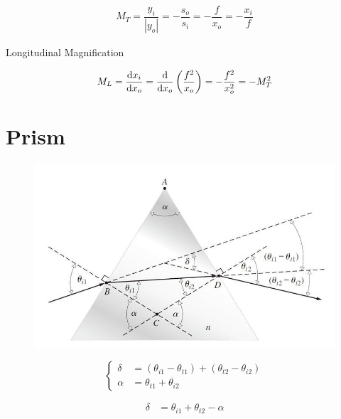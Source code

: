 \begin{equation*}
  \begin{aligned}
    M_T = \dfrac{y_i}{|y_o|} = - \dfrac{s_o}{s_i} = - \dfrac{f}{x_o} = - \dfrac{x_i}{f}  
  \end{aligned}
\end{equation*}

Longitudinal Magnification

\begin{equation*}
  \begin{aligned}
    M_L = \dfrac{\mathop{}\!\mathrm{d} x_i}{\mathop{}\!\mathrm{d} x_o} = \dfrac{\mathop{}\!\mathrm{d}}{\mathop{}\!\mathrm{d} x_o} \left( \dfrac{f^2}{x_o}  \right) = - \dfrac{f^2}{x_o^2} = - M_T^2   
  \end{aligned}
\end{equation*}

\section{Prism}

\begin{figure}[H]
  \centering
  \includegraphics[width=0.5\linewidth]{figures/Prism}
  \label{fig:}
\end{figure}

\begin{equation*}
  \left\{
  \begin{aligned}
    \delta &= \left( \theta_{i1} - \theta_{t1} \right) + \left( \theta_{t2} - \theta_{i2} \right) \\
    \alpha &= \theta_{t1} + \theta_{i2}
  \end{aligned}
  \right.
\end{equation*}

\begin{equation*}
  \begin{aligned}
    \delta &= \theta_{i1} + \theta_{t2} - \alpha
  \end{aligned}
\end{equation*}

